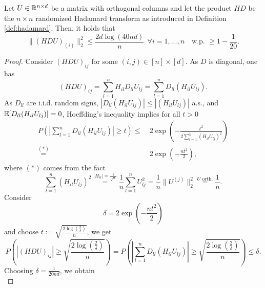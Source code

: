 \begin{lemma}
\begin{mdframed}
Let $U\in \mathbb{R}^{n \times d}$ be a matrix with orthogonal columns and let the product $HD$ be the $n\times n$ randomized Hadamard transform as introduced in Definition \ref{def:hadamard}. Then, it holds that
\begin{equation*}
\|(HDU)_{(i)}\|_2^2 \leq \frac{2d\log(40nd)}{n}\ \ \forall i=1,...,n		\quad \text{w.p. } \geq 1-\frac{1}{20}.
\end{equation*}
\end{mdframed}
\begin{proof}
Consider $(HDU)_{ij}$ for some $(i,j)\in [n]\times [d]$. As $D$ is diagonal, one has
\begin{equation*}
(HDU)_{ij} = \sum_{l=1}^n H_{il}D_{ll}U_{lj} = \sum_{l=1}^n D_{ll}(H_{il}U_{lj}).
\end{equation*}
As $D_{ll}$ are i.i.d. random signs, $|D_{ll}(H_{il}U_{lj})|\leq |(H_{il}U_{lj})|$ a.s., and $\mathbb{E}[D_{ll}(H_{il}U_{lj})] = 0$, Hoeffding's inequality implies for all $t>0$
\begin{equation*}
\begin{split}
P\left( \left|
\sum_{l=1}^n D_{ll}(H_{il}U_{lj})
\right| \geq t \right)  
\leq & \ 2 \exp \left( -
\frac{t^2}{2\sum_{l=1}^n(H_{il}U_{lj})^2}
\right)\\
\overset{(*)}{=} & \  2 \exp \left( 
- \frac{nt^2}{2}
\right),
\end{split}
\end{equation*}
where $(*)$ comes from the fact
\begin{equation*}
\sum_{l=1}^n (H_{il}U_{lj})^2 \overset{|H_{il}|=\frac{1}{\sqrt{n}}}{=} \frac{1}{n}\sum_{l=1}^n U_{lj}^2 = \frac{1}{n}\|U^{(j)}\|_2^2 \overset{U \text{ orth.}}{=} \frac{1}{n}.
\end{equation*}
Consider 
\begin{equation*}
\delta = 2 \exp \left( 
- \frac{nt^2}{2}
\right)
\end{equation*}
and choose $t:= \sqrt{\frac{2\log\left(\frac{2}{\delta}\right)}{n}}$,
we get
\begin{equation}\label{eq:help}
P\left( \left|
(HDU)_{ij}
\right| \geq \sqrt{\frac{2\log\left(\frac{2}{\delta}\right)}{n}} \right)  =
P\left( \left|
\sum_{l=1}^n D_{ll}(H_{il}U_{lj})
\right| \geq \sqrt{\frac{2\log\left(\frac{2}{\delta}\right)}{n}} \right)  
\leq \delta.
\end{equation}
Choosing $\delta = \frac{1}{20nd}$, we obtain
\begin{equation*}

\end{equation*}
\end{proof}
\end{lemma}
